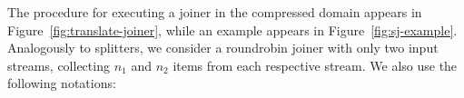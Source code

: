 
The procedure for executing a joiner in the compressed domain appears
in Figure~\ref{fig:translate-joiner}, while an example appears in
Figure~\ref{fig:sj-example}.  Analogously to splitters, we consider a
roundrobin joiner with only two input streams, collecting $n_1$ and
$n_2$ items from each respective stream.  We also use the following
notations:

